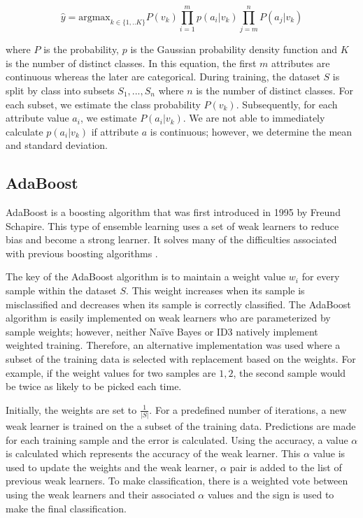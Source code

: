 \documentclass[11pt]{article}
\begin{document}
$$\hat{y}= \mathrm{argmax}_{k\in\{1,..K\}} P(v_k)\prod_{i=1}^mp\left(a_i|v_k\right)\prod_{j=m}^nP\left(a_j|v_k\right)$$

where $P$ is the probability, $p$ is the Gaussian probability density function and $K$ is the number of distinct classes. In this equation, the first $m$ attributes are continuous whereas the later are categorical. During training, the dataset $S$ is split by class into subsets ${S_1,...,S_n}$ where $n$ is the number of distinct classes. For each subset, we estimate the class probability $P(v_k)$. Subsequently, for each attribute value $a_i$, we estimate $P(a_i|v_k)$. We are not able to immediately calculate $p(a_i|v_k)$ if attribute $a$ is continuous; however, we determine the mean and standard deviation.

\subsection{AdaBoost} \label{adaboost}
AdaBoost is a boosting algorithm that was first introduced in 1995 by Freund Schapire. This type of ensemble learning uses a set of weak learners to reduce bias and become a strong learner. It solves many of the difficulties associated with previous boosting algorithms \cite{Schapire:1999:BIB:1624312.1624417}.

The key of the AdaBoost algorithm is to maintain a weight value $w_i$ for every sample within the dataset $S$. This weight increases when its sample is misclassified and decreases when its sample is correctly classified. The AdaBoost algorithm is easily implemented on weak learners who are parameterized by sample weights; however, neither Naïve Bayes or ID3 natively implement weighted training. Therefore, an alternative implementation was used where a subset of the training data is selected with replacement based on the weights. For example, if the weight values for two samples are ${1, 2}$, the second sample would be twice as likely to be picked each time.

Initially, the weights are set to $\frac{1}{|S|}$. For a predefined number of iterations, a new weak learner is trained on the a subset of the training data. Predictions are made for each training sample and the error is calculated. Using the accuracy, a value $\alpha$ is calculated which represents the accuracy of the weak learner. This $\alpha$ value is used to update the weights and the weak learner, $\alpha$ pair is added to the list of previous weak learners. To make classification, there is a weighted vote between using the weak learners and their associated $\alpha$ values and the sign is used to make the final classification.
\end{document}
